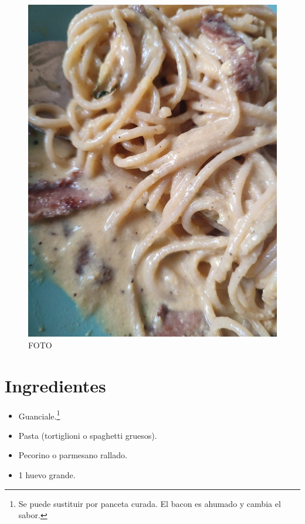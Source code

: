\documentclass[
]{book}
\providecommand{\tightlist}{%
  \setlength{\itemsep}{0pt}\setlength{\parskip}{0pt}}
\begin{document}
\begin{figure}
\centering
\includegraphics{images/carbonara.jpeg}
\caption{FOTO}
\end{figure}

\hypertarget{ingredientes-1}{%
\section*{Ingredientes}\label{ingredientes-1}}

\begin{itemize}
\tightlist
\item
  Guanciale.\footnote{Se puede sustituir por panceta curada. El bacon es ahumado y cambia el sabor.}
\item
  Pasta (tortiglioni o spaghetti gruesos).
\item
  Pecorino o parmesano rallado.
\item
  1 huevo grande.
\end{itemize}
\end{document}
